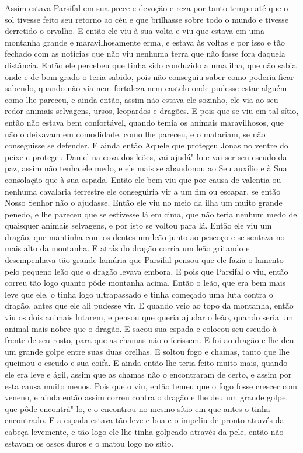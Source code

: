 Assim estava Parsifal em sua prece e devoção e reza por tanto tempo até que
o sol tivesse feito seu retorno ao céu e que brilhasse sobre todo o mundo e
tivesse derretido o orvalho. E então ele viu à sua volta e viu que estava em
uma montanha grande e maravilhosamente erma, e estava às voltas e por isso e
tão fechado com as notícias que não viu nenhuma terra que não fosse fora
daquela distância. Então ele percebeu que tinha sido conduzido a uma ilha, que
não sabia onde e de bom grado o teria sabido, pois não conseguiu saber como
poderia ficar sabendo, quando não via nem fortaleza nem castelo onde pudesse
estar alguém como lhe pareceu, e ainda então, assim não estava ele sozinho, ele
via ao seu redor animais selvagens, ursos, leopardos e dragões. E pois que se
viu em tal sítio, então não estava bem confortável, quando temia os animais
maravilhosos, que não o deixavam em comodidade, como lhe pareceu, e o matariam,
se não conseguisse se defender. E ainda então Aquele que protegeu Jonas no
ventre do peixe e protegeu Daniel na cova dos leões, vai ajudá"-lo e vai ser seu
escudo da paz, assim não tenha ele medo, e ele mais se abandonou ao Seu auxílio
e à Sua consolação que à sua espada. Então ele bem viu que por causa de
valentia ou nenhuma cavalaria terrestre ele conseguiria vir a um fim ou
escapar, se então Nosso Senhor não o ajudasse. Então ele viu no meio da ilha um
muito grande penedo, e lhe pareceu que se estivesse lá em cima, que não teria
nenhum medo de quaisquer animais selvagens, e por isto se voltou para lá. Então
ele viu um dragão, que mantinha com os dentes um leão junto ao pescoço e se
sentava no mais alto da montanha. E atrás do dragão corria um leão gritando e
desempenhava tão grande lamúria que Parsifal pensou que ele fazia o lamento
pelo pequeno leão que o dragão levava embora. E pois que Parsifal o viu, então
correu tão logo quanto pôde montanha acima. Então o leão, que era bem mais leve
que ele, o tinha logo ultrapassado e tinha começado uma luta contra o dragão, antes
que ele ali pudesse vir. E quando veio ao topo da montanha, então viu os dois
animais lutarem, e pensou que queria ajudar o leão, quando seria um animal mais
nobre que o dragão. E sacou sua espada e colocou seu escudo à frente de seu
rosto, para que as chamas não o ferissem. E foi ao dragão e lhe deu um grande
golpe entre suas duas orelhas. E soltou fogo e chamas, tanto que lhe queimou o
escudo e sua coifa. E ainda então lhe teria feito muito mais, quando ele era
leve e ágil, assim que as chamas não o encontraram de certo, e assim por esta
causa muito menos. Pois que o viu, então temeu que o fogo fosse crescer com
veneno, e ainda então assim correu contra o dragão e lhe deu um grande golpe,
que pôde encontrá"-lo, e o encontrou no mesmo sítio em que antes o tinha
encontrado. E a espada estava tão leve e boa e o impeliu de pronto através da
cabeça levemente, e tão logo ele lhe tinha golpeado através da pele, então não
estavam os ossos duros e o matou logo no sítio. 

